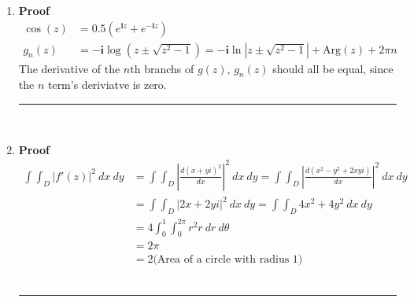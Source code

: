 \documentclass{article}%
\newcommand\abs[1]{\left|#1\right|}
\newcommand\Arg[1]{\text{Arg}#1}
\newcommand\I{\textbf{i}}
\newenvironment{proof}[1][]{\begin{samepage}\textbf{Proof #1} \\ }{\\ \rule{0.5em}{0.5em} \end{samepage} \\}
\begin{document}
\begin{enumerate}
\begin{proof}
    \end{proof}
    \setcounter{enumi}{4}
    \item %
    \begin{proof}
        \begin{align*}
            \cos(z) &= 0.5 (e^{\I z} + e^{-\I z}) \\
            g_n(z) &= -\I \log(z \pm \sqrt{z^2-1}) = -\I\ln{\abs{z \pm \sqrt{z^2-1}}} + \Arg(z) + 2 \pi n
        \end{align*}
        The derivative of the $n$th branchs of $g(z)$, $g_n(z)$ should all be equal, since the $n$ term's deriviatve is zero.
    \end{proof}
    \setcounter{enumi}{8}
    \item %
    \begin{proof}
        \begin{align*}
            \int \int_D \abs{f'(z)}^2\ dx\ dy &= \int \int_D \abs{\frac{d (x+yi)^2}{dx}}^2\ dx\ dy = \int \int_D \abs{\frac{d (x^2-y^2+2xyi)}{dx}}^2\ dx\ dy\\
                                              &= \int \int_D \abs{2x + 2yi}^2\ dx\ dy = \int \int_D 4x^2 + 4y^2\ dx\ dy  \\
                                              &= 4 \int_{0}^{1} \int_{0}^{2\pi} r^2 r\ dr\ d\theta \\
                                              &= 2 \pi \\
                                              &= 2 \text{(Area of a circle with radius 1)}
        \end{align*}
    \end{proof}
\end{enumerate}
\end{document}
